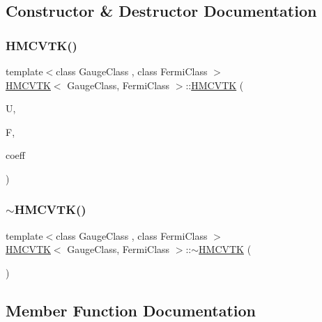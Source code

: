 \subsection{Constructor \& Destructor Documentation}
\mbox{\label{class_h_m_c_v_t_k_a2142d0912c699151a5ff53039ad7389c}} 
\subsubsection{\texorpdfstring{H\+M\+C\+V\+T\+K()}{HMCVTK()}}
{\footnotesize\ttfamily template$<$class Gauge\+Class , class Fermi\+Class $>$ \\
\hyperlink{class_h_m_c_v_t_k}{H\+M\+C\+V\+TK}$<$ Gauge\+Class, Fermi\+Class $>$\+::\hyperlink{class_h_m_c_v_t_k}{H\+M\+C\+V\+TK} (\begin{DoxyParamCaption}\item[{Gauge\+Class \&}]{U,  }\item[{Fermi\+Class \&}]{F,  }\item[{\hyperlink{classcoefficients}{coefficients} \&}]{coeff }\end{DoxyParamCaption})\hspace{0.3cm}{\ttfamily [inline]}}

\mbox{\label{class_h_m_c_v_t_k_ad4c849424d6ccd199101173c18d5175a}} 
\subsubsection{\texorpdfstring{$\sim$\+H\+M\+C\+V\+T\+K()}{~HMCVTK()}}
{\footnotesize\ttfamily template$<$class Gauge\+Class , class Fermi\+Class $>$ \\
\hyperlink{class_h_m_c_v_t_k}{H\+M\+C\+V\+TK}$<$ Gauge\+Class, Fermi\+Class $>$\+::$\sim$\hyperlink{class_h_m_c_v_t_k}{H\+M\+C\+V\+TK} (\begin{DoxyParamCaption}{ }\end{DoxyParamCaption})\hspace{0.3cm}{\ttfamily [inline]}}



\subsection{Member Function Documentation}
\mbox{\label{class_h_m_c_v_t_k_a9edf4ea22315f10fec9f6270387ed09d}} 
